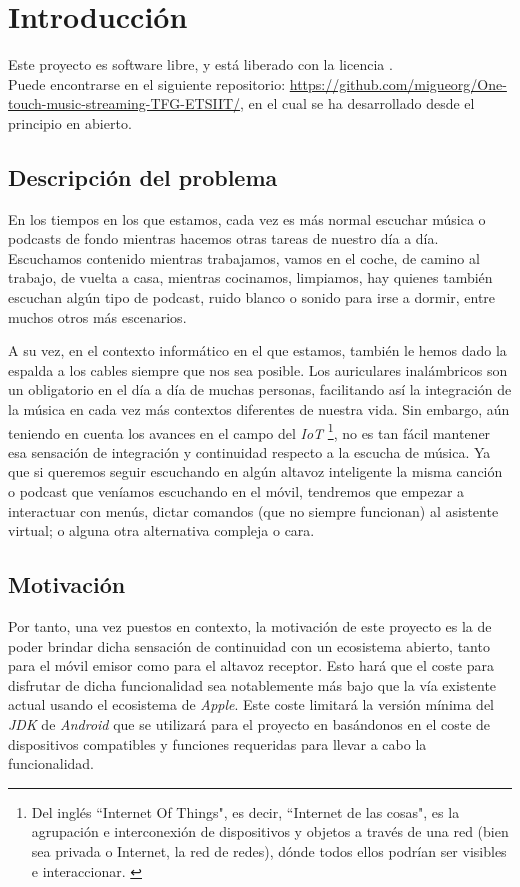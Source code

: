 \chapter{Introducción}

Este proyecto es software libre, y está liberado con la licencia \cite{gplv3}.\\

Puede encontrarse en el siguiente repositorio:
\url{https://github.com/migueorg/One-touch-music-streaming-TFG-ETSIIT/}, en el
cual se ha desarrollado desde el principio en abierto.

\section{Descripción del problema}
En los tiempos en los que estamos, cada vez es más normal escuchar música o
podcasts de fondo mientras hacemos otras tareas de nuestro día a día. Escuchamos
contenido mientras trabajamos, vamos en el coche, de camino al trabajo, de
vuelta a casa, mientras cocinamos, limpiamos, hay quienes también escuchan algún
tipo de podcast, ruido blanco o sonido para irse a dormir, entre muchos otros
más escenarios. 

A su vez, en el contexto informático en el que estamos, también le hemos dado la
espalda a los cables siempre que nos sea posible. Los auriculares inalámbricos
son un obligatorio en el día a día de muchas personas, facilitando así la
integración de la música en cada vez más contextos diferentes de nuestra vida.
Sin embargo, aún teniendo en cuenta los avances en el campo del \emph{IoT}
\footnote{Del inglés ``Internet Of Things", es decir, ``Internet de las cosas", es
la agrupación e interconexión de dispositivos y objetos a través de una red
(bien sea privada o Internet, la red de redes), dónde todos ellos podrían ser
visibles e interaccionar. \cite{IoT}}, no es tan fácil mantener esa sensación de
integración y continuidad respecto a la escucha de música. Ya que si queremos
seguir escuchando en algún altavoz inteligente la misma canción o podcast que
veníamos escuchando en el móvil, tendremos que empezar a interactuar con menús,
dictar comandos (que no siempre funcionan) al asistente virtual; o alguna otra
alternativa compleja o cara.\\

\section{Motivación}
Por tanto, una vez puestos en contexto, la motivación de este proyecto es la de
poder brindar dicha sensación de continuidad con un ecosistema abierto, tanto
para el móvil emisor como para el altavoz receptor. Esto hará que el coste para
disfrutar de dicha funcionalidad sea notablemente más bajo que la vía existente
actual usando el ecosistema de \emph{Apple}. Este coste limitará la versión
mínima del \emph{JDK} de \emph{Android} que se utilizará para el proyecto en
basándonos en el coste de dispositivos compatibles y funciones requeridas para
llevar a cabo la funcionalidad.

